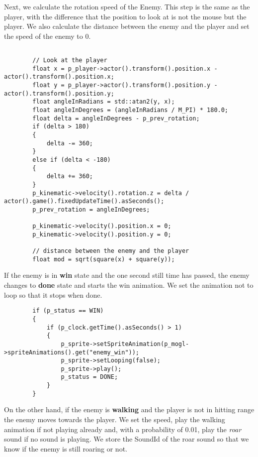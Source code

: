 Next, we calculate the rotation speed of the Enemy. This step is the same as the player, 
with the difference that the position to look at is not the mouse but the player. We 
also calculate the distance between the enemy and the player and set the speed of the 
enemy to 0.

\begin{lstlisting}

        // Look at the player
        float x = p_player->actor().transform().position.x - actor().transform().position.x;
        float y = p_player->actor().transform().position.y - actor().transform().position.y;
        float angleInRadians = std::atan2(y, x);
        float angleInDegrees = (angleInRadians / M_PI) * 180.0;
        float delta = angleInDegrees - p_prev_rotation;
        if (delta > 180)
        {
            delta -= 360;
        }
        else if (delta < -180)
        {
            delta += 360;
        }
        p_kinematic->velocity().rotation.z = delta / actor().game().fixedUpdateTime().asSeconds();
        p_prev_rotation = angleInDegrees;

        p_kinematic->velocity().position.x = 0;
        p_kinematic->velocity().position.y = 0;

        // distance between the enemy and the player
        float mod = sqrt(square(x) + square(y));
\end{lstlisting}

If the enemy is in \textbf{win} state and the one second still time has passed, the 
enemy changes to \textbf{done} state and starts the win animation. We set the animation 
not to loop so that it stops when done.

\begin{lstlisting}
        if (p_status == WIN)
        {
            if (p_clock.getTime().asSeconds() > 1)
            {
                p_sprite->setSpriteAnimation(p_mogl->spriteAnimations().get("enemy_win"));
                p_sprite->setLooping(false);
                p_sprite->play();
                p_status = DONE;
            }
        }
\end{lstlisting}

On the other hand, if the enemy is \textbf{walking} and the player is not in hitting range 
the enemy moves towards the player. We set the speed, play the walking animation if 
not playing already and, with a probability of 0.01, play the \textit{roar} sound if 
no sound is playing. We store the SoundId of the roar sound so that we know if the 
enemy is still roaring or not.

